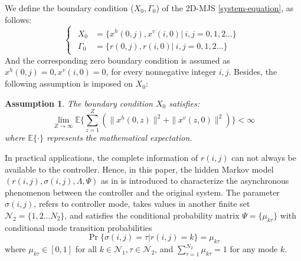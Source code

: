\documentclass[conference]{IEEEtran}
\newtheorem{assumption}{Assumption}
\begin{document}
	We define the boundary condition ($X_{0},\varGamma_{0}$) of the 2D-MJS \eqref{system-equation}, as follows:
	\begin{equation} \label{boundary-condition}
	\left\{
		\begin{array}{lr}
			\begin{split}
				X_{0} &= \{x^{h}(0,j),x^{v}(i,0)|\ i,j = 0,1,2...\}\\
				\varGamma_{0} &= \{r(0,j), r(i,0)|\ i,j = 0,1,2... \}
			\end{split}
		\end{array}
	\right.
	\end{equation}
	And the corresponding zero boundary condition is assumed as $x^{h}(0,j) =0, x^{v}(i,0)=0$, for every nonnegative integer $i,j$. Besides, the following assumption is imposed on $X_{0}$:
	
	\begin{assumption}\label{boundary-assumptin}
	 	The boundary condition $X_{0}$ satisfies:
	 	\begin{equation}
	 		\lim\limits_{Z\to\infty}\mathbb{E}\Big\{\sum_{z=1}^{Z}(\|x^{h}(0,z)\|^{2}+ \|x^{v}(z,0)\|^{2})\Big\} < \infty
	 	\end{equation}
	 	where $\mathbb{E}\{\cdot\}$ represents the mathematical expectation.
	\end{assumption}
	
	In practical applications, the complete information of $r(i,j)$ can not always be available to the controller. Hence, in this paper, the hidden Markov model $(r(i,j),\sigma(i,j),\varLambda,\varPsi)$ as in \cite{passive_wu} is introduced to characterize the asynchronous phenomenon between the controller and the original system. The parameter $\sigma(i,j)$, refers to controller mode, takes values in another finite set $\mathcal{N}_{2} = \{1,2...N_{2}\}$, and satisfies the conditional probability matrix $\varPsi=\{\mu_{k\tau }\}$ with conditional mode transition probabilities
	\begin{equation}
		\Pr\{\sigma(i,j)=\tau|r(i,j)=k\}=\mu_{k\tau } %
	\end{equation}
	where $\mu_{k\tau }\in[0,1]$ for all $k\in\mathcal{N}_{1}, \tau\in\mathcal{N}_{2}$, and $\sum_{\tau =1}^{N_{2}}\mu_{k\tau } = 1$ for any mode $k$.
	
\end{document}
